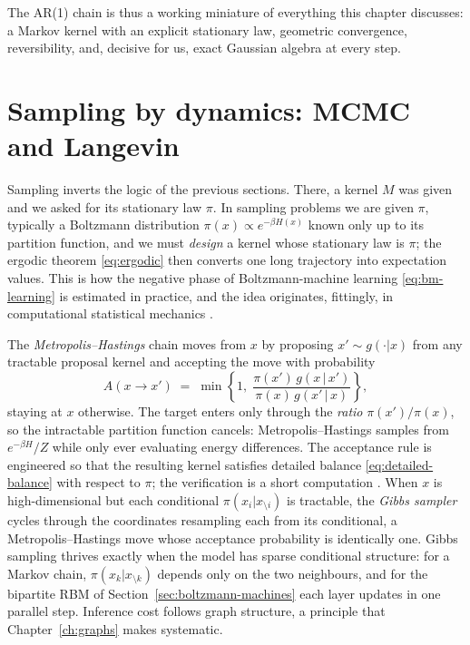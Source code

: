 The AR(1) chain is thus a working miniature of everything this chapter
discusses: a Markov kernel with an explicit stationary law, geometric
convergence, reversibility, and, decisive for us, exact Gaussian algebra
at every step.

\section{Sampling by dynamics: MCMC and Langevin}\label{sec:mcmc}

Sampling inverts the logic of the previous sections. There, a kernel $M$
was given and we asked for its stationary law $\pi$. In sampling problems
we are given $\pi$, typically a Boltzmann distribution
$\pi(x) \propto e^{-\beta H(x)}$ known only up to its partition function,
and we must \emph{design} a kernel whose stationary law is $\pi$; the
ergodic theorem \eqref{eq:ergodic} then converts one long trajectory into
expectation values. This is how the negative phase of Boltzmann-machine
learning \eqref{eq:bm-learning} is estimated in practice, and the idea
originates, fittingly, in computational statistical mechanics
\citep{metropolis1953equation}.

The \emph{Metropolis--Hastings} chain \citep{metropolis1953equation,
hastings1970monte} moves from $x$ by proposing $x' \sim g(\cdot|x)$ from
any tractable proposal kernel and accepting the move with probability
\begin{equation}
  A(x \to x') \;=\; \min\!\left\{ 1,\;
    \frac{\pi(x')\, g(x \,|\, x')}{\pi(x)\, g(x' \,|\, x)}
  \right\},
  \label{eq:mh-acceptance}
\end{equation}
staying at $x$ otherwise. The target enters only through the \emph{ratio}
$\pi(x')/\pi(x)$, so the intractable partition function cancels:
Metropolis--Hastings samples from $e^{-\beta H}/Z$ while only ever
evaluating energy differences. The acceptance rule is engineered so that
the resulting kernel satisfies detailed balance
\eqref{eq:detailed-balance} with respect to $\pi$; the verification is a
short computation \citep[Chapter~7]{robert2004monte}. When $x$ is
high-dimensional but each conditional $\pi(x_i | x_{\setminus i})$ is
tractable, the \emph{Gibbs sampler} \citep{geman1984stochastic} cycles
through the coordinates resampling each from its conditional, a
Metropolis--Hastings move whose acceptance probability is identically
one. Gibbs sampling thrives exactly when the model has sparse conditional
structure: for a Markov chain, $\pi(x_k | x_{\setminus k})$ depends only
on the two neighbours, and for the bipartite RBM of
Section~\ref{sec:boltzmann-machines} each layer updates in one parallel
step. Inference cost follows graph structure, a principle that
Chapter~\ref{ch:graphs} makes systematic.


